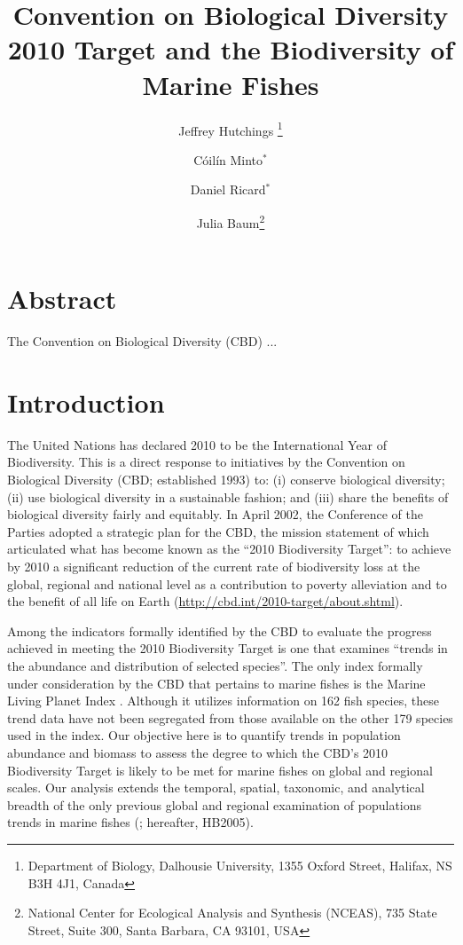 \documentclass[letterpaper,12pt]{article}
\title{Convention on Biological Diversity 2010 Target and the
Biodiversity of Marine Fishes}
\author{Jeffrey Hutchings
\thanks{Department of Biology, Dalhousie University, 1355 Oxford
Street, Halifax, NS B3H 4J1, Canada} \and C{\'o}il{\'i}n Minto$^{*}$
\and Daniel Ricard$^{*}$ \and Julia Baum\thanks{National Center for
Ecological Analysis and Synthesis (NCEAS), 735 State Street, Suite
300, Santa Barbara, CA 93101, USA} }
\begin{document}
\maketitle{}

\section*{Abstract} 
The Convention on Biological Diversity (CBD) ...

\section{Introduction} 
The United Nations has declared 2010 to be the
International Year of Biodiversity. This is a direct response to
initiatives by the Convention on Biological Diversity (CBD;
established 1993) to: (i) conserve biological diversity; (ii) use
biological diversity in a sustainable fashion; and (iii) share the
benefits of biological diversity fairly and equitably. In April 2002,
the Conference of the Parties adopted a strategic plan for the CBD,
the mission statement of which articulated what has become known as
the ``2010 Biodiversity Target'': to achieve by 2010 a significant
reduction of the current rate of biodiversity loss at the global,
regional and national level as a contribution to poverty alleviation
and to the benefit of all life on Earth
(\url{http://cbd.int/2010-target/about.shtml}).  

Among the indicators formally identified by the CBD to evaluate the
progress achieved in meeting the 2010 Biodiversity Target is one that examines
``trends in the abundance and distribution of selected species''. The
only index formally under consideration by the CBD that pertains to
marine fishes is the Marine Living Planet Index \citep{WWF:2008}.
Although it utilizes information on 162 fish species, these trend data have
not been segregated from those available on the other 179 species used
in the index.  Our objective here is to quantify trends in population
abundance and biomass to assess the degree to which the CBD's 2010 Biodiversity
Target is likely to be met for marine fishes on global and regional
scales. Our analysis extends the temporal, spatial, taxonomic, and
analytical breadth of the only previous global and regional
examination of populations trends in marine fishes
(\cite{Hutchings:Baum:2005:philtransB}; hereafter, HB2005).
\end{document}
